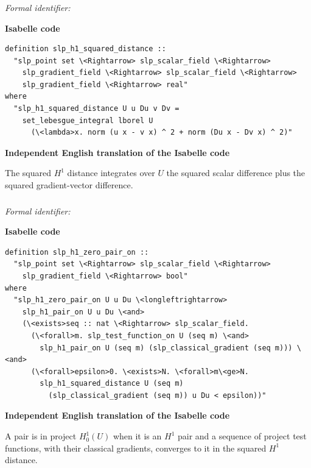 \documentclass[10pt,oneside]{article}
\newcommand{\reviewlabel}[1]{\par\smallskip\noindent\textsf{\bfseries #1}\par\smallskip}
\begin{document}
\subsubsection{\texttt{}}
\noindent\textit{Formal identifier:} \texttt{}

\reviewlabel{Isabelle code}
\begin{lstlisting}
definition slp_h1_squared_distance ::
  "slp_point set \<Rightarrow> slp_scalar_field \<Rightarrow>
    slp_gradient_field \<Rightarrow> slp_scalar_field \<Rightarrow>
    slp_gradient_field \<Rightarrow> real"
where
  "slp_h1_squared_distance U u Du v Dv =
    set_lebesgue_integral lborel U
      (\<lambda>x. norm (u x - v x) ^ 2 + norm (Du x - Dv x) ^ 2)"
\end{lstlisting}

\reviewlabel{Independent English translation of the Isabelle code}
The squared $H^1$ distance integrates over $U$ the squared scalar difference plus the squared gradient-vector difference.

\subsubsection{\texttt{}}
\noindent\textit{Formal identifier:} \texttt{}

\reviewlabel{Isabelle code}
\begin{lstlisting}
definition slp_h1_zero_pair_on ::
  "slp_point set \<Rightarrow> slp_scalar_field \<Rightarrow>
    slp_gradient_field \<Rightarrow> bool"
where
  "slp_h1_zero_pair_on U u Du \<longleftrightarrow>
    slp_h1_pair_on U u Du \<and>
    (\<exists>seq :: nat \<Rightarrow> slp_scalar_field.
      (\<forall>m. slp_test_function_on U (seq m) \<and>
        slp_h1_pair_on U (seq m) (slp_classical_gradient (seq m))) \<and>
      (\<forall>epsilon>0. \<exists>N. \<forall>m\<ge>N.
        slp_h1_squared_distance U (seq m)
          (slp_classical_gradient (seq m)) u Du < epsilon))"
\end{lstlisting}

\reviewlabel{Independent English translation of the Isabelle code}
A pair is in project $H^1_0(U)$ when it is an $H^1$ pair and a sequence of project test functions, with their classical gradients, converges to it in the squared $H^1$ distance.
\end{document}
